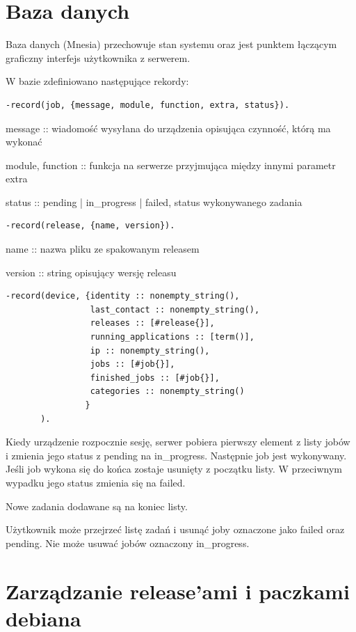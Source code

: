 \documentclass[polish,12pt]{aghthesis}
\begin{document}
\section{Baza danych}

Baza danych (Mnesia) przechowuje stan systemu oraz jest punktem łączącym graficzny interfejs użytkownika z serwerem.

W bazie zdefiniowano następujące rekordy:

\begin{lstlisting}
-record(job, {message, module, function, extra, status}).
\end{lstlisting}

message :: wiadomość wysyłana do urządzenia opisująca czynność, którą ma wykonać

module, function :: funkcja na serwerze przyjmująca między innymi parametr extra

status :: pending | in\_progress | failed, status wykonywanego zadania

\begin{lstlisting}
-record(release, {name, version}).
\end{lstlisting}

name :: nazwa pliku ze spakowanym releasem

version :: string opisujący wersję releasu

\begin{lstlisting}
-record(device, {identity :: nonempty_string(),
                 last_contact :: nonempty_string(),
                 releases :: [#release{}],
                 running_applications :: [term()],
                 ip :: nonempty_string(),
                 jobs :: [#job{}],
                 finished_jobs :: [#job{}],
                 categories :: nonempty_string()
                }
       ).
\end{lstlisting}

Kiedy urządzenie rozpocznie sesję, serwer pobiera pierwszy element z listy jobów i zmienia jego status z pending na in\_progress. Następnie job jest wykonywany. Jeśli job wykona się do końca zostaje usunięty z początku listy. W przeciwnym wypadku jego status zmienia się na failed.

Nowe zadania dodawane są na koniec listy.

Użytkownik może przejrzeć listę zadań i usunąć joby oznaczone jako failed oraz pending. Nie może usuwać jobów oznaczony in\_progress.

\section{Zarządzanie release'ami i paczkami debiana}
\end{document}
